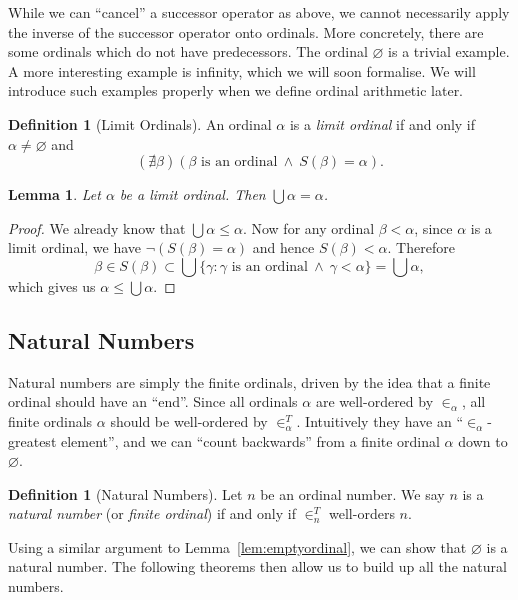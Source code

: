 \documentclass[a4paper,11pt]{article}
\theoremstyle{plain}
\newtheorem{lem}[thm]{Lemma}
\theoremstyle{definition}
\newtheorem{defn}[thm]{Definition}
\theoremstyle{remark}
\begin{document}
While we can ``cancel'' a successor operator as above, we cannot necessarily apply the inverse of the successor operator onto ordinals. More concretely, there are some ordinals which do not have predecessors. The ordinal $\varnothing$ is a trivial example. A more interesting example is infinity, which we will soon formalise. We will introduce such examples properly when we define ordinal arithmetic later.

\begin{defn}[Limit Ordinals]
An ordinal $\alpha$ is a \textit{limit ordinal} if and only if $\alpha\neq\varnothing$ and 
\[(\nexists \beta)(\beta \text{ is an ordinal}\ \land \ S(\beta) = \alpha).\]
\end{defn}

\begin{lem}
\label{lem:LimitOrdinalUnion}
Let $\alpha$ be a limit ordinal. Then $\bigcup \alpha = \alpha$.
\end{lem}
\begin{proof}
We already know that $\bigcup \alpha \leq \alpha$. Now for any ordinal $\beta < \alpha$, since $\alpha$ is a limit ordinal, we have $\lnot(S(\beta) = \alpha)$ and hence $S(\beta) < \alpha$. Therefore
\[\beta \in S(\beta) \subset \bigcup \{\gamma:\gamma\text{ is an ordinal}\ \land\ \gamma<\alpha\} = \bigcup\alpha,\]
which gives us $\alpha \leq \bigcup\alpha$.
\end{proof}

\subsection{Natural Numbers}
Natural numbers are simply the finite ordinals, driven by the idea that a finite ordinal should have an ``end''. Since all ordinals $\alpha$ are well-ordered by $\in_\alpha$, all finite ordinals $\alpha$ should be well-ordered by $\in_\alpha^T$. Intuitively they have an ``$\in_\alpha$-greatest element'', and we can ``count backwards'' from a finite ordinal $\alpha$ down to $\varnothing$.

\begin{defn}[Natural Numbers]
Let $n$ be an ordinal number. We say $n$ is a \textit{natural number} (or \textit{finite ordinal}) if and only if $\in_n^T$ well-orders $n$.
\end{defn}

Using a similar argument to Lemma~\ref{lem:emptyordinal}, we can show that $\varnothing$ is a natural number. The following theorems then allow us to build up all the natural numbers.
\end{document}
